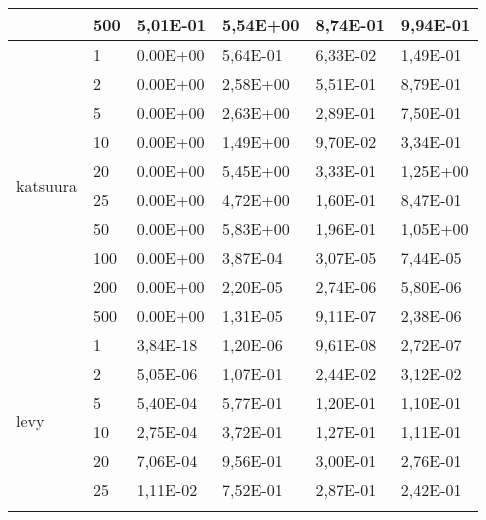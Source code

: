 \begin{longtable}[c]{|m{3.5cm}|l|l|l|l|l|}
                                        & 500       & 5,01E-01   & 5,54E+00   & 8,74E-01   & 9,94E-01  \\ \hline
\multirow{10}{*}{katsuura}              & 1         & 0.00E+00   & 5,64E-01   & 6,33E-02   & 1,49E-01  \\ \cline{2-6} 
                                        & 2         & 0.00E+00   & 2,58E+00   & 5,51E-01   & 8,79E-01  \\ \cline{2-6} 
                                        & 5         & 0.00E+00   & 2,63E+00   & 2,89E-01   & 7,50E-01  \\ \cline{2-6} 
                                        & 10        & 0.00E+00   & 1,49E+00   & 9,70E-02   & 3,34E-01  \\ \cline{2-6} 
                                        & 20        & 0.00E+00   & 5,45E+00   & 3,33E-01   & 1,25E+00  \\ \cline{2-6} 
                                        & 25        & 0.00E+00   & 4,72E+00   & 1,60E-01   & 8,47E-01  \\ \cline{2-6} 
                                        & 50        & 0.00E+00   & 5,83E+00   & 1,96E-01   & 1,05E+00  \\ \cline{2-6} 
                                        & 100       & 0.00E+00   & 3,87E-04   & 3,07E-05   & 7,44E-05  \\ \cline{2-6} 
                                        & 200       & 0.00E+00   & 2,20E-05   & 2,74E-06   & 5,80E-06  \\ \cline{2-6} 
                                        & 500       & 0.00E+00   & 1,31E-05   & 9,11E-07   & 2,38E-06  \\ \hline
\multirow{10}{*}{levy}                  & 1         & 3,84E-18   & 1,20E-06   & 9,61E-08   & 2,72E-07  \\ \cline{2-6} 
                                        & 2         & 5,05E-06   & 1,07E-01   & 2,44E-02   & 3,12E-02  \\ \cline{2-6} 
                                        & 5         & 5,40E-04   & 5,77E-01   & 1,20E-01   & 1,10E-01  \\ \cline{2-6} 
                                        & 10        & 2,75E-04   & 3,72E-01   & 1,27E-01   & 1,11E-01  \\ \cline{2-6} 
                                        & 20        & 7,06E-04   & 9,56E-01   & 3,00E-01   & 2,76E-01  \\ \cline{2-6} 
                                        & 25        & 1,11E-02   & 7,52E-01   & 2,87E-01   & 2,42E-01  \\ \cline{2-6} 

\end{longtable}
